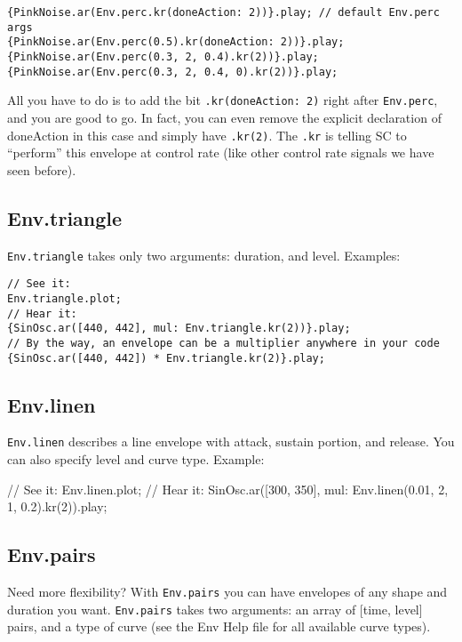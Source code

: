  
\begin{lstlisting}[style=SuperCollider-IDE, basicstyle=\scttfamily\footnotesize]
{PinkNoise.ar(Env.perc.kr(doneAction: 2))}.play; // default Env.perc args
{PinkNoise.ar(Env.perc(0.5).kr(doneAction: 2))}.play; 
{PinkNoise.ar(Env.perc(0.3, 2, 0.4).kr(2))}.play;
{PinkNoise.ar(Env.perc(0.3, 2, 0.4, 0).kr(2))}.play;
\end{lstlisting}
 

All you have to do is to add the bit \texttt{.kr(doneAction: 2)} right after \texttt{Env.perc}, and you are good to go. In fact, you can even remove the explicit declaration of doneAction in this case and simply have \texttt{.kr(2)}. The \texttt{.kr} is telling SC to ``perform'' this envelope at control rate (like other control rate signals we have seen before).

\subsection{Env.triangle}

\texttt{Env.triangle} takes only two arguments: duration, and level. Examples:

 
\begin{lstlisting}[style=SuperCollider-IDE, basicstyle=\scttfamily\footnotesize]
// See it:
Env.triangle.plot;
// Hear it:
{SinOsc.ar([440, 442], mul: Env.triangle.kr(2))}.play;
// By the way, an envelope can be a multiplier anywhere in your code
{SinOsc.ar([440, 442]) * Env.triangle.kr(2)}.play;
\end{lstlisting}

\subsection{Env.linen}

\texttt{Env.linen} describes a line envelope with attack, sustain portion, and release. You can also specify level and curve type. Example:

// See it:
Env.linen.plot;
// Hear it:
{SinOsc.ar([300, 350], mul: Env.linen(0.01, 2, 1, 0.2).kr(2))}.play;

\subsection{Env.pairs}

Need more flexibility? With \texttt{Env.pairs} you can have envelopes of any shape and duration you want. \texttt{Env.pairs} takes two arguments: an array of [time, level] pairs, and a type of curve (see the Env Help file for all available curve types).

